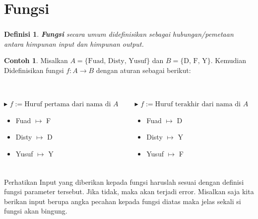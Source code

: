 \documentclass[aspectratio=169]{beamer}
\newtheorem*{definisi}{Definisi}
\theoremstyle{definition}
\newtheorem*{contoh}{Contoh}
\begin{document}
    \section{Fungsi}
    \begin{frame}
        \frametitle{\insertsection}
        \begin{definisi}
            \textbf{Fungsi} secara umum didefinisikan sebagai hubungan/pemetaan antara himpunan input dan himpunan output.
        \end{definisi}
        \begin{contoh}
            Misalkan $A=\{\text{Fuad, Disty, Yusuf}\}$  dan $B=\{\text{D, F, Y}\}$. Kemudian Didefinisikan fungsi $f:A\to B$ dengan aturan sebagai berikut:\\~\\
            \begin{columns}
                \begin{column}{0.5\textwidth}
                    $\blacktriangleright$ $f:=\text{Huruf pertama dari nama di } A$
                    \begin{itemize}[label=$\bullet$]
                        \item Fuad $\mapsto$ F
                        \item Disty $\mapsto$ D
                        \item Yusuf $\mapsto$ Y
                    \end{itemize}
                \end{column}
                \begin{column}{0.5\textwidth}
                    $\blacktriangleright$ $f:=\text{Huruf terakhir dari nama di } A$
                    \begin{itemize}[label=$\bullet$]
                        \item Fuad $\mapsto$ D
                        \item Disty $\mapsto$ Y
                        \item Yusuf $\mapsto$ F
                    \end{itemize}
                \end{column}
            \end{columns}
        \end{contoh}
    \end{frame}

    \begin{frame}
        \frametitle{\insertsection}
        \begin{alertblock}{Perhatikan}
            Input yang diberikan kepada fungsi haruslah sesuai dengan definisi fungsi parameter tersebut. Jika tidak, maka akan terjadi error. Misalkan saja kita berikan input berupa angka pecahan kepada fungsi diatas maka jelas sekali si fungsi akan bingung.
        \end{alertblock}
    \end{frame}
\end{document}
